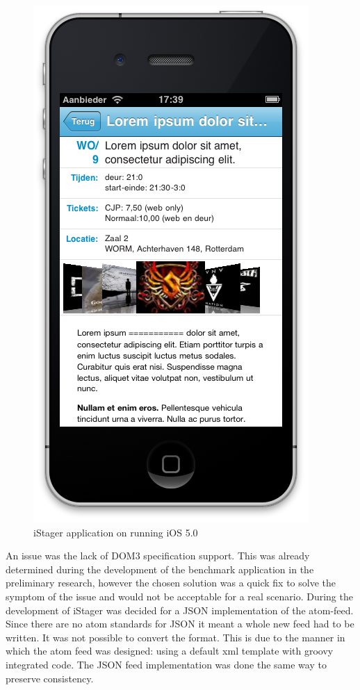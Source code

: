 \begin{figure}
\begin{minipage}{2.2in}
		\includegraphics[scale=0.15]{images/iStager_2.png}
	\end{minipage}%
	\caption{iStager application on running iOS 5.0}%
	\label{fig:1figs}%
\end{figure}


An issue was the lack of DOM3 specification support. This was already determined during the development of the benchmark application in the preliminary research, however the chosen solution was a quick fix to solve the symptom of the issue and would not be acceptable for a real scenario. During the development of iStager was decided for a JSON implementation of the atom-feed. Since there are no atom standards for JSON it meant a whole new feed had to be written. It was not possible to convert the format. This is due to the manner in which the atom feed was designed: using a default xml template with groovy integrated code. The JSON feed implementation was done the same way to preserve consistency.

